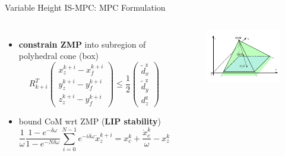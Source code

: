 \documentclass[10pt]{beamer}
\begin{document}
\begin{frame}{Variable Height IS-MPC: MPC Formulation}
  \begin{columns}[c,onlytextwidth]
			\begin{itemize}
			  \item \textbf{constrain ZMP} into subregion of polyhedral cone (box)
					\begin{equation*}
						R_{k+i}^T
						\begin{pmatrix}
							x_z^{k+i} - x_f^{k+i} \\
							y_z^{k+i} - y_f^{k+i} \\
							z_z^{k+i} - y_f^{k+i}
						\end{pmatrix}
						\le
						\frac{1}{2}
						\begin{pmatrix}
							\tilde{d}_x^\text{z} \\
							\tilde{d}_y^\text{z} \\
							d_z^\text{z}
						\end{pmatrix}
					\end{equation*}
				\item bound CoM wrt ZMP (\textbf{LIP stability})
					\begin{equation*}
						\frac{1}{\omega}\frac{1-e^{-\delta\omega}}{1-e^{-N\delta\omega}}
							\sum_{i=0}^{N-1} e^{-i\delta\omega} \dot{x}_z^{k+i} =
							x_c^k + \frac{\dot{x}_c^k}{\omega} - x_z^k
					\end{equation*}
			\end{itemize}
		  \begin{figure}
				\centering
				\includegraphics[width=\textwidth]{figures/balance3d.pdf}

\end{figure}
\end{columns}
\end{frame}
\end{document}

